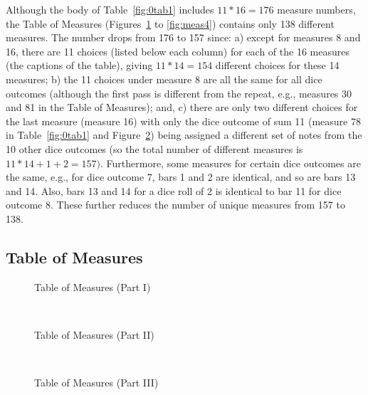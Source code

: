 \documentclass[letterpaper,x11names,svgnames,10pt]{article}
\begin{document}
Although the body of Table~\ref{fig:0tab1} includes $11*16 = 176$ measure numbers, the Table of Measures (Figures~\ref{fig:meas1} to \ref{fig:meas4}) contains only 138 different measures.  The number drops from 176 to 157 since: a) except for measures 8 and 16, there are 11 choices (listed below each column) for each of the 16 measures (the captions of the table), giving $11*14=154$ different choices for these 14 measures; b) the 11 choices under measure 8 are all the same for all dice outcomes (although the first pass is different from the repeat, e.g., measures 30 and 81 in the Table of Measures); and, c) there are only two different choices for the last measure (measure 16) with only the dice outcome of sum 11 (measure 78 in Table~\ref{fig:0tab1} and Figure~\ref{fig:meas2}) being assigned a different set of notes from the 10 other dice outcomes (so the total number of different measures is $11*14 + 1 + 2 = 157)$. Furthermore, some measures for certain dice outcomes are the same, e.g., for dice outcome 7, bars 1 and 2 are identical, and so are bars 13 and 14. Also, bars 13 and 14 for a dice roll of 2 is identical to bar 11 for dice outcome 8. These further reduces the number of unique measures from 157 to 138.  

\nopagebreak[4]
\subsection{Table of Measures}

\begin{figure}[H]
	\centering
	\def\svgwidth{0.975\columnwidth}
	
	\caption{Table of Measures (Part I)}
	\label{fig:meas1}
\end{figure}

\newpage
${}_{}$\\
\vspace{0.10in}
\begin{figure}[H]
	\centering
	\def\svgwidth{0.975\columnwidth}
	
	\caption{Table of Measures (Part II)}
	\label{fig:meas2}
\end{figure}

\newpage
${}_{}$\\
\vspace{0.10in}
\begin{figure}[H]
	\centering
	\def\svgwidth{0.975\columnwidth}
	
	\caption{Table of Measures (Part III)}
	\label{fig:meas3}
\end{figure}
\end{document}

